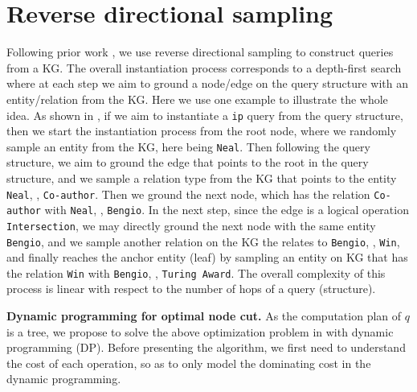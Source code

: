\section{Reverse directional sampling}
\label{app:reverse_sample}
Following prior work \citep{ren2020query2box,ren2020beta}, we use reverse directional sampling to construct queries from a KG. The overall instantiation process corresponds to a depth-first search where at each step we aim to ground a node/edge on the query structure with an entity/relation from the KG. Here we use one example to illustrate the whole idea. As shown in , if we aim to instantiate a \texttt{ip} query from the query structure, then we start the instantiation process from the root node, where we randomly sample an entity from the KG, here being \texttt{Neal}. Then following the query structure, we aim to ground the edge that points to the root in the query structure, and we sample a relation type from the KG that points to the entity \texttt{Neal}, \eg, \texttt{Co-author}. Then we ground the next node, which has the relation \texttt{Co-author} with \texttt{Neal}, \eg, \texttt{Bengio}. In the next step, since the edge is a logical operation \texttt{Intersection}, we may directly ground the next node with the same entity \texttt{Bengio}, and we sample another relation on the KG the relates to \texttt{Bengio}, \eg, \texttt{Win}, and finally reaches the anchor entity (leaf) by sampling an entity on KG that has the relation \texttt{Win} with \texttt{Bengio}, \eg, \texttt{Turing Award}. The overall complexity of this process is linear with respect to the number of hops of a query (structure).



\textbf{Dynamic programming for optimal node cut.}
\label{app:cut_dp}
As the computation plan of $q$ is a tree, we propose to solve the above optimization problem in  with dynamic programming (DP). Before presenting the algorithm, we first need to understand the cost of each operation, so as to only model the dominating cost in the dynamic programming. 

